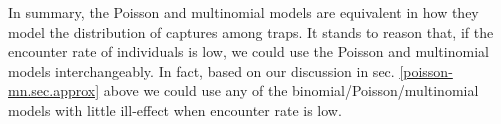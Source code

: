 In summary, the Poisson and multinomial models are equivalent in how
they model the distribution of captures among traps.
 It stands to reason that, if the encounter
rate of individuals is low, we could use the Poisson and multinomial
models interchangeably. In fact, based on our discussion in sec.
\ref{poisson-mn.sec.approx}
above we could use any of the binomial/Poisson/multinomial models with
little ill-effect when encounter rate is low. 





